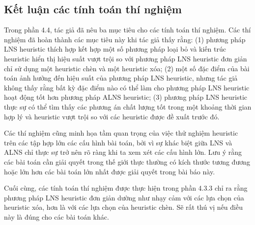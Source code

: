 \subsection{Kết luận các tính toán thí nghiệm}
Trong phần 4.4, tác giả đã nêu ba mục tiêu cho các tính toán thí nghiệm. Các thí nghiệm đã hoàn thành các mục tiêu này khi tác giả thấy rằng: (1) phương pháp LNS heuristic thích hợp kết hợp một số phương pháp loại bỏ và kiến trúc heuristic hiển thị hiệu suất vượt trội so với phương pháp LNS heuristic đơn giản chỉ sử dụng một heuristic chèn và một heuristic xóa; (2) một số đặc điểm của bài toán ảnh hưởng đến hiệu suất của phương pháp LNS heuristic, nhưng tác giả không thấy rằng bất kỳ đặc điểm nào có thể làm cho phương pháp LNS heuristic hoạt động tốt hơn phương pháp ALNS heuristic; (3) phương pháp LNS heuristic thực sự có thể tìm thấy các phương án chất lượng tốt trong một khoảng thời gian hợp lý và heuristic vượt trội so với các heuristic được đề xuất trước đó.

Các thí nghiệm cũng minh họa tầm quan trọng của việc thử nghiệm heuristic trên các tập hợp lớn các cấu hình bài toán, bởi vì sự khác biệt giữa LNS và ALNS chỉ thực sự trở nên rõ ràng khi ta xem xét các cấu hình lớn. Lưu ý rằng các bài toán cần giải quyết trong thế giới thực thường có kích thước tương đương hoặc lớn hơn các bài toán lớn nhất được giải quyết trong bài báo này.

Cuối cùng, các tính toán thí nghiệm được thực hiện trong phần 4.3.3 chỉ ra rằng phương pháp LNS heuristic đơn giản dường như nhạy cảm với các lựa chọn của heuristic xóa, hơn là với các lựa chọn của heuristic chèn. Sẽ rất thú vị nếu điều này là đúng cho các bài toán khác.


